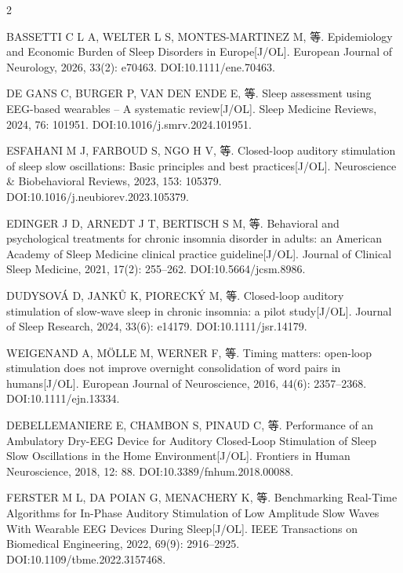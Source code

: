 \documentclass[UTF8,zihao=5,fontset=none]{ctexart}
\newcommand{\song}{\CJKfamily{song}}
\newcommand{\hei}{\CJKfamily{hei}}
\begin{document}
\begin{multicols}{2}
\vspace{15.6pt}\noindent{\hei\fontsize{12pt}{14.4pt}\selectfont\bfseries 参考文献}\par\vspace{8pt}
{\song\fontsize{7.5pt}{9pt}\selectfont\setlength{\parindent}{0pt}\setlength{\parskip}{0pt}%
\sloppy
{}
\makebox[25.2pt][l]{[1]}BASSETTI C L A, WELTER L S, MONTES-MARTINEZ M, 等. Epidemiology and Economic Burden of Sleep Disorders in Europe[J/OL]. European Journal of Neurology, 2026, 33(2): e70463. DOI:10.1111/ene.70463.\par
\makebox[25.2pt][l]{[2]}DE GANS C, BURGER P, VAN DEN ENDE E, 等. Sleep assessment using EEG-based wearables – A systematic review[J/OL]. Sleep Medicine Reviews, 2024, 76: 101951. DOI:10.1016/j.smrv.2024.101951.\par
\makebox[25.2pt][l]{[3]}ESFAHANI M J, FARBOUD S, NGO H V, 等. Closed-loop auditory stimulation of sleep slow oscillations: Basic principles and best practices[J/OL]. Neuroscience \& Biobehavioral Reviews, 2023, 153: 105379. DOI:10.1016/j.neubiorev.2023.105379.\par
\makebox[25.2pt][l]{[4]}EDINGER J D, ARNEDT J T, BERTISCH S M, 等. Behavioral and psychological treatments for chronic insomnia disorder in adults: an American Academy of Sleep Medicine clinical practice guideline[J/OL]. Journal of Clinical Sleep Medicine, 2021, 17(2): 255--262. DOI:10.5664/jcsm.8986.\par
\makebox[25.2pt][l]{[5]}DUDYSOVÁ D, JANKŮ K, PIORECKÝ M, 等. Closed-loop auditory stimulation of slow-wave sleep in chronic insomnia: a pilot study[J/OL]. Journal of Sleep Research, 2024, 33(6): e14179. DOI:10.1111/jsr.14179.\par
\makebox[25.2pt][l]{[6]}WEIGENAND A, MÖLLE M, WERNER F, 等. Timing matters: open-loop stimulation does not improve overnight consolidation of word pairs in humans[J/OL]. European Journal of Neuroscience, 2016, 44(6): 2357--2368. DOI:10.1111/ejn.13334.\par
\makebox[25.2pt][l]{[7]}DEBELLEMANIERE E, CHAMBON S, PINAUD C, 等. Performance of an Ambulatory Dry-EEG Device for Auditory Closed-Loop Stimulation of Sleep Slow Oscillations in the Home Environment[J/OL]. Frontiers in Human Neuroscience, 2018, 12: 88. DOI:10.3389/fnhum.2018.00088.\par
\makebox[25.2pt][l]{[8]}FERSTER M L, DA POIAN G, MENACHERY K, 等. Benchmarking Real-Time Algorithms for In-Phase Auditory Stimulation of Low Amplitude Slow Waves With Wearable EEG Devices During Sleep[J/OL]. IEEE Transactions on Biomedical Engineering, 2022, 69(9): 2916--2925. DOI:10.1109/tbme.2022.3157468.\par
}
\end{multicols}
\end{document}
